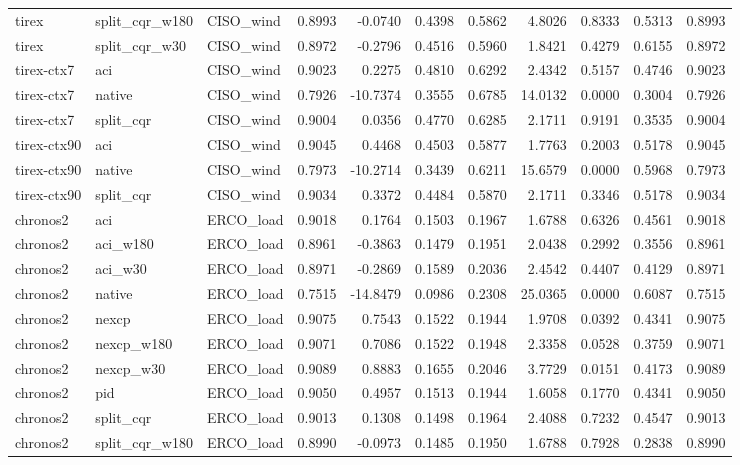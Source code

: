\begin{tabular}{lllrrrrrrrr}
tirex & split_cqr_w180 & CISO_wind & 0.8993 & -0.0740 & 0.4398 & 0.5862 & 4.8026 & 0.8333 & 0.5313 & 0.8993 \\
tirex & split_cqr_w30 & CISO_wind & 0.8972 & -0.2796 & 0.4516 & 0.5960 & 1.8421 & 0.4279 & 0.6155 & 0.8972 \\
tirex-ctx7 & aci & CISO_wind & 0.9023 & 0.2275 & 0.4810 & 0.6292 & 2.4342 & 0.5157 & 0.4746 & 0.9023 \\
tirex-ctx7 & native & CISO_wind & 0.7926 & -10.7374 & 0.3555 & 0.6785 & 14.0132 & 0.0000 & 0.3004 & 0.7926 \\
tirex-ctx7 & split_cqr & CISO_wind & 0.9004 & 0.0356 & 0.4770 & 0.6285 & 2.1711 & 0.9191 & 0.3535 & 0.9004 \\
tirex-ctx90 & aci & CISO_wind & 0.9045 & 0.4468 & 0.4503 & 0.5877 & 1.7763 & 0.2003 & 0.5178 & 0.9045 \\
tirex-ctx90 & native & CISO_wind & 0.7973 & -10.2714 & 0.3439 & 0.6211 & 15.6579 & 0.0000 & 0.5968 & 0.7973 \\
tirex-ctx90 & split_cqr & CISO_wind & 0.9034 & 0.3372 & 0.4484 & 0.5870 & 2.1711 & 0.3346 & 0.5178 & 0.9034 \\
chronos2 & aci & ERCO_load & 0.9018 & 0.1764 & 0.1503 & 0.1967 & 1.6788 & 0.6326 & 0.4561 & 0.9018 \\
chronos2 & aci_w180 & ERCO_load & 0.8961 & -0.3863 & 0.1479 & 0.1951 & 2.0438 & 0.2992 & 0.3556 & 0.8961 \\
chronos2 & aci_w30 & ERCO_load & 0.8971 & -0.2869 & 0.1589 & 0.2036 & 2.4542 & 0.4407 & 0.4129 & 0.8971 \\
chronos2 & native & ERCO_load & 0.7515 & -14.8479 & 0.0986 & 0.2308 & 25.0365 & 0.0000 & 0.6087 & 0.7515 \\
chronos2 & nexcp & ERCO_load & 0.9075 & 0.7543 & 0.1522 & 0.1944 & 1.9708 & 0.0392 & 0.4341 & 0.9075 \\
chronos2 & nexcp_w180 & ERCO_load & 0.9071 & 0.7086 & 0.1522 & 0.1948 & 2.3358 & 0.0528 & 0.3759 & 0.9071 \\
chronos2 & nexcp_w30 & ERCO_load & 0.9089 & 0.8883 & 0.1655 & 0.2046 & 3.7729 & 0.0151 & 0.4173 & 0.9089 \\
chronos2 & pid & ERCO_load & 0.9050 & 0.4957 & 0.1513 & 0.1944 & 1.6058 & 0.1770 & 0.4341 & 0.9050 \\
chronos2 & split_cqr & ERCO_load & 0.9013 & 0.1308 & 0.1498 & 0.1964 & 2.4088 & 0.7232 & 0.4547 & 0.9013 \\
chronos2 & split_cqr_w180 & ERCO_load & 0.8990 & -0.0973 & 0.1485 & 0.1950 & 1.6788 & 0.7928 & 0.2838 & 0.8990 \\

\end{tabular}

